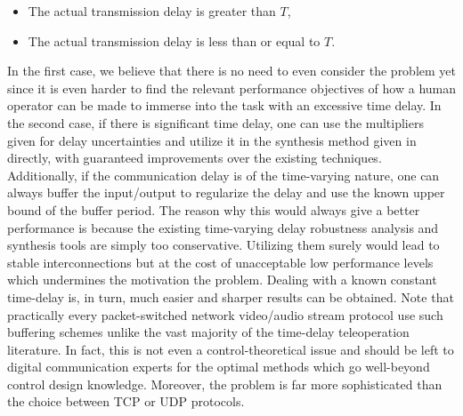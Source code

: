\begin{itemize}
	\item The actual transmission delay is greater than $T$,
    \item The actual transmission delay is less than or equal to $T$.
\end{itemize}

In the first case, we believe that there is no need to even consider the problem yet since it is even harder to find the relevant performance 
objectives of how a human operator can be made to immerse into the task with an excessive time delay. In the second case, if there is 
significant time delay, one can use the multipliers given  for delay uncertainties and utilize it in the synthesis 
method given in  directly, with guaranteed improvements over the existing techniques. Additionally, if the communication 
delay is of the time-varying nature, one can always buffer the input/output to regularize the delay and use the known upper bound of the 
buffer period. The reason why this would always give a better performance is because the existing time-varying delay robustness analysis 
and synthesis tools are simply too conservative. Utilizing them surely would lead to stable interconnections but at the cost of unacceptable
low performance levels which undermines the motivation the problem. Dealing with a known constant time-delay is, in turn, much easier and 
sharper results can be obtained. Note that practically every packet-switched network video/audio stream protocol use such buffering schemes 
unlike the vast majority of the time-delay teleoperation literature. In fact, this is not even a control-theoretical issue and should be left 
to digital communication experts for the optimal methods which go well-beyond control design knowledge. Moreover, the problem is far more 
sophisticated than the choice between TCP or UDP protocols. 

